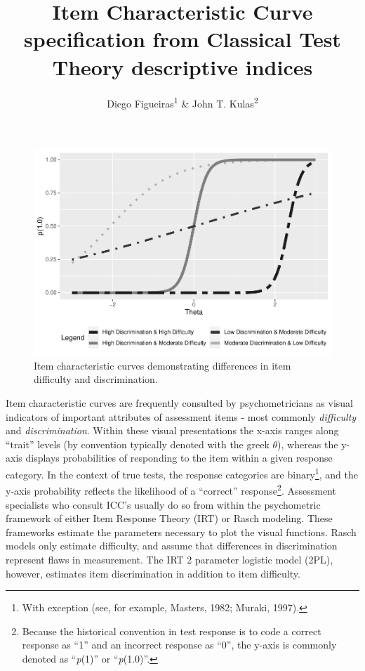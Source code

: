\documentclass[
  man]{apa6}
\title{Item Characteristic Curve specification from Classical Test Theory descriptive indices}
\author{Diego Figueiras\textsuperscript{1} \& John T. Kulas\textsuperscript{2}}
\date{}
\affiliation{\vspace{0.5cm}\textsuperscript{1} Montclair State University\\\textsuperscript{2} eRg}
\begin{document}
\maketitle

\begin{figure}
\includegraphics[width=1\linewidth,height=0.8\textheight]{ICC_project_files/figure-latex/example-1} \caption{Item characteristic curves demonstrating differences in item difficulty and discrimination.}\label{fig:example}
\end{figure}

Item characteristic curves are frequently consulted by psychometricians as visual indicators of important attributes of assessment items - most commonly \emph{difficulty} and \emph{discrimination}. Within these visual presentations the x-axis ranges along ``trait'' levels (by convention typically denoted with the greek \(\theta\)), whereas the y-axis displays probabilities of responding to the item within a given response category. In the context of true tests, the response categories are binary\footnote{With exception (see, for example, Masters, 1982; Muraki, 1997).}, and the y-axis probability reflects the likelihood of a ``correct'' response\footnote{Because the historical convention in test response is to code a correct response as ``1'' and an incorrect response as ``0'', the y-axis is commonly denoted as ``\emph{p}(1)'' or ``\emph{p}(1.0)''.}. Assessment specialists who consult ICC's usually do so from within the psychometric framework of either Item Response Theory (IRT) or Rasch modeling. These frameworks estimate the parameters necessary to plot the visual functions. Rasch models only estimate difficulty, and assume that differences in discrimination represent flaws in measurement. The IRT 2 parameter logistic model (2PL), however, estimates item discrimination in addition to item difficulty.
\end{document}

